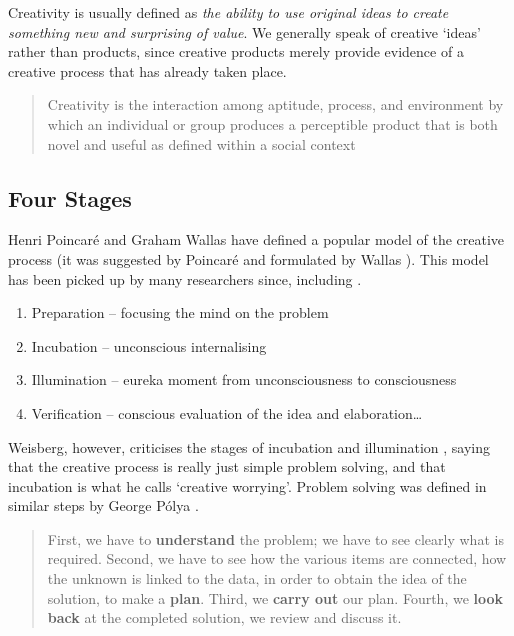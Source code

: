 Creativity is usually defined as \emph{the ability to use original ideas to create something new and surprising of value}. We generally speak of creative `ideas' rather than products, since creative products merely provide evidence of a creative process that has already taken place.

\begin{quotation}
  Creativity is the interaction among aptitude, process, and environment by which an individual or group produces a perceptible product that is both novel and useful as defined within a social context 
\end{quotation}


\subsection{Four Stages}
\label{s:4stages}

Henri Poincar{\'e} and Graham Wallas have defined a popular model of the creative process (it was suggested by Poincar{\'e} \autocite*{Poincare2001} and formulated by Wallas \autocite*{Wallas1926}). This model has been picked up by many researchers since, including \autocite{Boden2003, Koestler1964, Partridge1994}.

\begin{enumerate}
  \item Preparation – focusing the mind on the problem
  \item Incubation – unconscious internalising
  \item Illumination – eureka moment from unconsciousness to consciousness
  \item Verification – conscious evaluation of the idea and elaboration…
\end{enumerate}

Weisberg, however, criticises the stages of incubation and illumination \autocite[as cited in][]{Partridge1994}, saying that the creative process is really just simple problem solving, and that incubation is what he calls `creative worrying'. Problem solving was defined in similar steps by George P{\'o}lya \autocite*{Polya1957}.

\begin{quotation}
  First, we have to \textbf{understand} the problem; we have to see clearly what is required. Second, we have to see how the various items are connected, how the unknown is linked to the data, in order to obtain the idea of the solution, to make a \textbf{plan}. Third, we \textbf{carry out} our plan. Fourth, we \textbf{look back} at the completed solution, we review and discuss it. 
\end{quotation}


